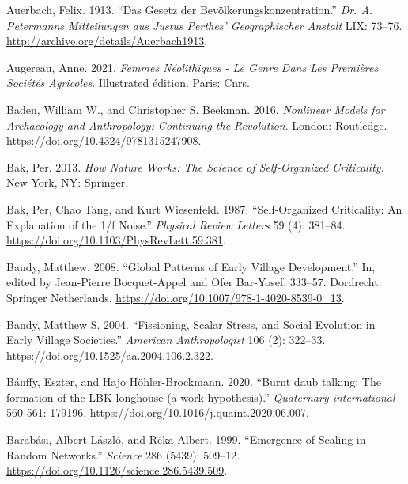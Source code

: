 \documentclass[
  12pt,
  a4paper, twoside]{book}
\newlength{\cslhangindent}
\newlength{\cslentryspacingunit} %
\newenvironment{CSLReferences}[2] %
 {%
  \setlength{\parindent}{0pt}
  \ifodd #1
  \let\oldpar\par
  \def\par{\hangindent=\cslhangindent\oldpar}
  \fi
  \setlength{\parskip}{#2\cslentryspacingunit}
 }%
 {}
\begin{document}
\begin{CSLReferences}{1}{0}
\leavevmode{}%
Auerbach, Felix. 1913. {``Das Gesetz der Bevölkerungskonzentration.''} \emph{Dr. A. Petermanns Mitteilungen aus Justus Perthes' Geographischer Anstalt} LIX: 73--76. \url{http://archive.org/details/Auerbach1913}.

\leavevmode{}%
Augereau, Anne. 2021. \emph{Femmes Néolithiques - Le Genre Dans Les Premières Sociétés Agricoles}. Illustrated édition. Paris: Cnrs.

\leavevmode{}%
Baden, William W., and Christopher S. Beekman. 2016. \emph{Nonlinear Models for Archaeology and Anthropology: Continuing the Revolution}. London: Routledge. \url{https://doi.org/10.4324/9781315247908}.

\leavevmode{}%
Bak, Per. 2013. \emph{How {Nature Works}: {The Science} of {Self-Organized Criticality}}. {New York, NY}: {Springer}.

\leavevmode{}%
Bak, Per, Chao Tang, and Kurt Wiesenfeld. 1987. {``Self-Organized Criticality: {An} Explanation of the 1/f Noise.''} \emph{Physical Review Letters} 59 (4): 381--84. \url{https://doi.org/10.1103/PhysRevLett.59.381}.

\leavevmode{}%
Bandy, Matthew. 2008. {``Global Patterns of Early Village Development.''} In, edited by Jean-Pierre Bocquet-Appel and Ofer Bar-Yosef, 333--57. Dordrecht: Springer Netherlands. \url{https://doi.org/10.1007/978-1-4020-8539-0_13}.

\leavevmode{}%
Bandy, Matthew S. 2004. {``Fissioning, Scalar Stress, and Social Evolution in Early Village Societies.''} \emph{American Anthropologist} 106 (2): 322--33. \url{https://doi.org/10.1525/aa.2004.106.2.322}.

\leavevmode{}%
Bánffy, Eszter, and Hajo Höhler-Brockmann. 2020. {``Burnt daub talking: The formation of the LBK longhouse (a work hypothesis).''} \emph{Quaternary international} 560-561: 179196. \url{https://doi.org/10.1016/j.quaint.2020.06.007}.

\leavevmode{}%
Barabási, Albert-László, and Réka Albert. 1999. {``Emergence of Scaling in Random Networks.''} \emph{Science} 286 (5439): 509--12. \url{https://doi.org/10.1126/science.286.5439.509}.


\end{CSLReferences}
\end{document}
